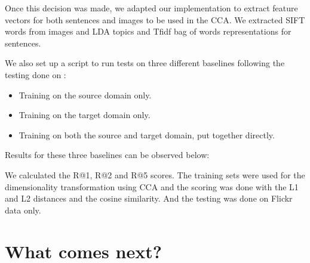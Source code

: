 \documentclass[11pt]{article}
\begin{document}
Once this decision was made, we adapted our implementation to extract feature vectors for both sentences and images to be used in the CCA. We extracted SIFT words from images and LDA topics and Tfidf bag of words representations for sentences. 

We also set up a script to run tests on three different baselines following the testing done on \cite{daumeiii:2007:ACLMain}:

\begin{itemize}
\item Training on the source domain only.
\item Training on the target domain only.
\item Training on both the source and target domain, put together directly.
\end{itemize}

Results for these three baselines can be observed below:


We calculated the R@1, R@2 and R@5 scores. The training sets were used for the dimensionality transformation using CCA and the scoring was done with the L1 and L2 distances and the cosine similarity. And the testing was done on Flickr data only. 

\begin{comment}
\begin{table}[htbp]
\centering
\begin{tabular}
{l*{6}{c}r} Training Domain & Measure & R@1 & R@5 & R@10 \\ \hline 
Source Only & L1 & 4 & 0 & 2\\
 & L2 & 3 & 0 & 3\\ 
 & Cosine & 2 & 1 & 3\\
 \hline
 Target Only & L1 & 4 & 0 & 2\\
 & L2 & 3 & 0 & 3\\ 
 & Cosine & 2 & 1 & 3\\
 \hline
 Source and Target& L1 & 4 & 0 & 2\\
 & L2 & 3 & 0 & 3\\ 
 & Cosine & 2 & 1 & 3\\
 \hline
\end{tabular}
\caption{ ** Note ** These results were calculated late at night. They might contain errors}
\label{table1}
\end{table}
\end{comment}


\section{What comes next?}
\end{document}
